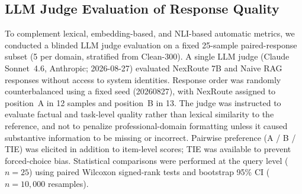 \documentclass[a4paper,fleql,doubleblind]{cas-sc}
\begin{document}
\subsection{LLM Judge Evaluation of Response Quality}
\label{ssec:llm_judge}

To complement lexical, embedding-based, and NLI-based automatic metrics,
we conducted a blinded LLM judge evaluation on a fixed 25-sample
paired-response subset (5 per domain, stratified from Clean-300).
A single LLM judge (Claude Sonnet~4.6, Anthropic; 2026-08-27) evaluated
NexRoute 7B and Naive RAG responses without access to system identities.
Response order was randomly counterbalanced using a fixed seed (20260827),
with NexRoute assigned to position~A in 12 samples and position~B in 13.
The judge was instructed to evaluate factual and task-level quality rather than
lexical similarity to the reference, and not to penalize professional-domain
formatting unless it caused substantive information to be missing or incorrect.
Pairwise preference (A / B / TIE) was elicited in addition to item-level scores;
TIE was available to prevent forced-choice bias.
Statistical comparisons were performed at the query level ($n{=}25$) using
paired Wilcoxon signed-rank tests and bootstrap 95\% CI ($n{=}10{,}000$ resamples).
\end{document}
